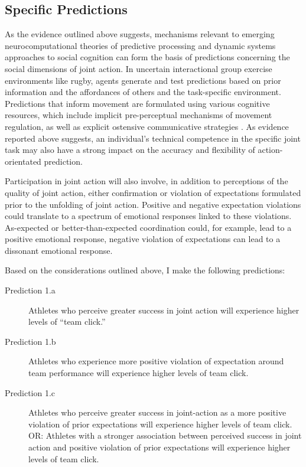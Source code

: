 \clearpage

\begin{mccorrection}
  \section{Specific Predictions}
  As the evidence outlined above suggests, mechanisms relevant to emerging neurocomputational theories of predictive processing and dynamic systems approaches to social cognition can form the basis of predictions concerning the social dimensions of joint action.  In uncertain interactional group exercise environments like rugby, agents generate and test predictions based on prior information and the affordances of others and the task-specific environment.  Predictions that inform movement are formulated using various cognitive resources, which include implicit pre-perceptual mechanisms of movement regulation, as well as explicit ostensive communicative strategies \citep{Semin2008,Frith2010}.  As evidence reported above suggests, an individual's technical competence in the specific joint task may also have a strong impact on the accuracy and flexibility of action-orientated prediction.

  Participation in joint action will also involve, in addition to perceptions of the quality of joint action, either confirmation or violation of expectations formulated prior to the unfolding of joint action. Positive and negative expectation violations could translate to a spectrum of emotional responses linked to these violations.  As-expected or better-than-expected coordination could, for example, lead to a positive emotional response, negative violation of expectations can lead to a dissonant emotional response.

  Based on the considerations outlined above, I make the following predictions:

  \begin{indent}
    \begin{description}
      \item [Prediction 1.a] Athletes who perceive greater success in joint action will experience higher levels of ``team click.''
      \item [Prediction 1.b] Athletes who experience more positive violation of expectation around team performance will experience higher levels of team click.
      \item [Prediction 1.c] Athletes who perceive greater success in joint-action as a more positive violation of prior expectations will experience higher levels of team click. OR: Athletes with a stronger association between perceived success in joint action and positive violation of prior expectations will experience higher levels of team click.  \\
    \end{description}
  \end{indent}


\end{mccorrection}
